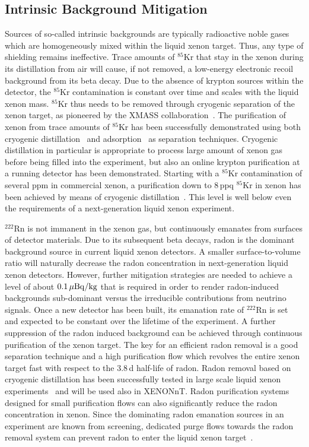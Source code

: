 \subsection{Intrinsic Background Mitigation}

Sources of so-called intrinsic backgrounds are typically radioactive noble gases which are homogeneously mixed within the liquid xenon target. Thus, any type of shielding remains ineffective. Trace amounts of $^{85}$Kr that stay in the xenon during its distillation from air will cause, if not removed, a low-energy electronic recoil background from its beta decay. Due to the absence of krypton sources within the detector, the $^{85}$Kr contamination is constant over time and scales with the liquid xenon mass. $^{85}$Kr thus needs to be removed through cryogenic separation of the xenon target, as pioneered by the XMASS collaboration~\cite{Abe:2008py}. The purification of xenon from trace amounts of $^{85}$Kr has been successfully demonstrated using both cryogenic distillation~\cite{Abe:2008py,Wang:2014ehv,Aprile:2016xhi} and adsorption~\cite{Bolozdynya:1997,Akerib:2016hcd} as separation techniques. Cryogenic distillation in particular is appropriate to process large amount of xenon gas before being filled into the experiment, but also an online krypton purification at a running detector has been demonstrated. Starting with a $^{85}$Kr contamination of several ppm in commercial xenon, a purification down to 8\,ppq $^{85}$Kr in xenon has been achieved by means of cryogenic distillation~\cite{Lindemann:2013kna}. This level is well below even the requirements of a next-generation liquid xenon experiment.

$^{222}$Rn is not immanent in the xenon gas, but continuously emanates from surfaces of detector materials. Due to its subsequent beta decays, radon is the dominant background source in current liquid xenon detectors. A smaller surface-to-volume ratio will naturally decrease the radon concentration in next-generation liquid xenon detectors. However, further mitigation strategies are needed to achieve a level of about $0.1\, \mathrm{\mu Bq/kg}$ that is required in order to render radon-induced backgrounds sub-dominant versus the irreducible contributions from neutrino signals. Once a new detector has been built, its emanation rate of $^{222}$Rn is set and expected to be constant over the lifetime of the experiment. A further suppression of the radon induced background can be achieved through continuous purification of the xenon target. The key for an efficient radon removal is a good separation technique and a high purification flow which revolves the entire xenon target fast with respect to the 3.8\,d half-life of radon. Radon removal based on cryogenic distillation has been successfully tested in large scale liquid xenon experiments~\cite{Aprile:2017kop} and will be used also in XENONnT. Radon purification systems designed for small purification flows can also significantly reduce the radon concentration in xenon. Since the dominating radon emanation sources in an experiment are known from screening, dedicated purge flows towards the radon removal system can prevent radon to enter the liquid xenon target~\cite{Akerib:2020com}.

